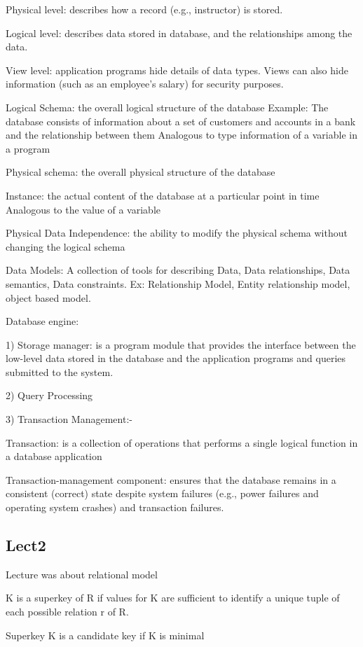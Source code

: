 \documentclass[8pt, a4paper, oneside, twocolumn]{extarticle}
\begin{document}
Physical level: describes how a record (e.g., instructor) is stored.

Logical level: describes data stored in database, and the relationships among 
the data.

View level: application programs hide details of data types.  Views can also 
hide information (such as an employee’s salary) for security purposes. 

Logical Schema: the overall logical structure of the database 
Example: The database consists of information about a set of customers and 
accounts in a bank and the relationship between them
Analogous to type information of a variable in a program

Physical schema: the overall physical structure of the database 

Instance: the actual content of the database at a particular point in time 
Analogous to the value of a variable

Physical Data Independence: the ability to modify the physical schema without 
changing the logical schema

Data Models: A collection of tools for describing Data, Data relationships, Data semantics, Data constraints. Ex: Relationship Model, Entity relationship model, object based model.

Database engine: 

1) Storage manager: is a program module that provides the interface between 
the low-level data stored in the database and the application programs and 
queries submitted to the system.

2) Query Processing

3) Transaction Management:- 

Transaction: is a collection of operations that performs a single 
logical function in a database application

Transaction-management component: ensures that the database 
remains in a consistent (correct) state despite system failures (e.g., 
power failures and operating system crashes) and transaction failures.
\subsection{Lect2}
Lecture was about relational model

K is a superkey of R if values for K are sufficient to identify a unique tuple of each possible relation r of R.

Superkey K is a candidate key if K is minimal
\end{document}
